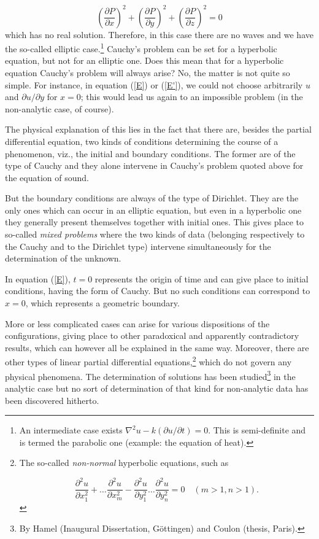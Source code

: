 \documentclass[12pt,oneside]{book}
\newcommand{\iit}[1]{\textit{#1}}
\begin{document}
\begin{equation*}
    \left(\frac{\partial P}{\partial x}\right)^2 + \left(\frac{\partial P}{\partial y}\right)^2 + \left(\frac{\partial P}{\partial z}\right)^2 = 0
\end{equation*}
which has no real solution. Therefore, in this case there are no waves and we
have the so-called elliptic case.\footnote{An intermediate case exists
$\nabla^2u-k(\partial u/\partial t)=0$. This is semi-definite and is termed the
parabolic one (example: the equation of heat).} Cauchy's problem can be set for
a hyperbolic equation, but not for an elliptic one. Does this mean that for a
hyperbolic equation Cauchy's problem will always arise? No, the matter is not
quite so simple. For instance, in equation (\ref{E}) or (\ref{E'}), we could not
choose arbitrarily $u$ and $\partial u/\partial y$ for $x=0$; this would lead us
again to an impossible problem (in the non-analytic case, of course). \par

The physical explanation of this lies in the fact that there are, besides the
partial differential equation, two kinds of conditions determining the course of
a phenomenon, viz., the initial and boundary conditions. The former are of the
type of Cauchy and they alone intervene in Cauchy's problem quoted above for the
equation of sound. \par

But the boundary conditions are always of the type of Dirichlet. They are the
only ones which can occur in an elliptic equation, but even in a hyperbolic one
they generally present themselves together with initial ones. This gives place
to so-called \iit{mixed problems} where the two kinds of data (belonging
respectively to the Cauchy and to the Dirichlet type) intervene simultaneously
for the determination of the unknown. \par

In equation (\ref{E}), $t=0$ represents the origin of time and can give place to
initial conditions, having the form of Cauchy. But no such conditions can
correspond to $x=0$, which represents a geometric boundary. \par

More or less complicated cases can arise for various dispositions of the
configurations, giving place to other paradoxical and apparently contradictory
results, which can however all be explained in the same way. Moreover, there are
other types of linear partial differential equations,\footnote{The so-called
  \iit{non-normal} hyperbolic equations, such as

\begin{equation*}
    \frac{\partial^2u}{\partial x_1^2}+\dots \frac{\partial^2u}{\partial x_m^2} - \frac{\partial^2u}{\partial y_1^2}\dots \frac{\partial^2u}{\partial y_n^2}=0 \quad (m>1,n>1).
\end{equation*} }
which do not govern any physical phenomena. The determination of solutions has
been studied\footnote{By Hamel (Inaugural Dissertation, G\"ottingen) and Coulon
(thesis, Paris).} in the analytic case but no sort of determination of that kind
for non-analytic data has been discovered hitherto. \par
\end{document}
